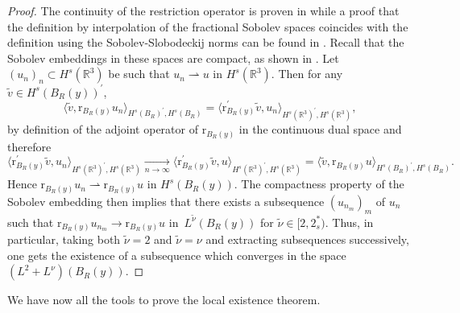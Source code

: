 \documentclass[12pt,a4paper]{amsart}
\numberwithin{equation}{section}
\newcommand{\twoasts}{{2^*_s}}
\begin{document}
	\begin{proof}
		The continuity of the restriction operator is proven in \cite[Theorem 9.1]{lions2012non} while a proof that the definition by interpolation of the fractional Sobolev spaces coincides with the definition using the Sobolev-Slobodeckij norms can be found in \cite[Remark 2, Section 4.4.1]{triebel1978interpolation}. Recall that the Sobolev embeddings in these spaces are compact, as shown in \cite[Theorem 7.1, Corollary 7.2]{dinezza2012521}.
		Let~$(u_n)_n \subset H^s(\mathbb{R}^3) $ be such that $ u_n \rightharpoonup u $ in $ H^{s}(\mathbb{R}^3) $. Then for any $ \tilde{v} \in H^{s}(B_R(y))^\prime $, 
		\begin{equation}
			\langle \tilde{v}, \mathrm{r}_{B_R(y)} u_n \rangle_{H^{s}(B_R)^\prime,H^{s}(B_R)} = \langle \mathrm{r}_{B_R(y)}^\prime \tilde{v}, u_n \rangle_{H^{s}(\mathbb{R}^3)^\prime,H^{s}(\mathbb{R}^3)} ,
		\end{equation}
		by definition of the adjoint operator of $ \mathrm{r}_{B_R(y)} $ in the continuous dual space and therefore
		\begin{equation}
			\langle \mathrm{r}_{B_R(y)}^\prime \tilde{v}, u_n \rangle_{H^{s}(\mathbb{R}^3)^\prime,H^{s}(\mathbb{R}^3)} 
			\xrightarrow[n\to\infty]{}  \langle \mathrm{r}_{B_R(y)}^\prime \tilde{v}, u \rangle_{H^{s}(\mathbb{R}^3)^\prime,H^{s}(\mathbb{R}^3)} 
			=  \langle \tilde{v}, \mathrm{r}_{B_R(y)} u \rangle_{H^{s}(B_R)^\prime,H^{s}(B_R)} .
		\end{equation}
		Hence  $ \mathrm{r}_{B_R(y)} u_n \rightharpoonup \mathrm{r}_{B_R(y)} u $ in $ H^{s}(B_R(y)) $. The compactness property of the Sobolev embedding then implies that there exists a subsequence $(u_{n_m})_m$ of $u_n$ such that $ \mathrm{r}_{B_R(y)} u_{n_m} \to \mathrm{r}_{B_R(y)} u  $ in~$L^{\tilde{\nu}}(B_R(y))$ for $\tilde{\nu}\in[2,\twoasts)$. Thus, in particular, taking both $\tilde{\nu}=2$ and $\tilde{\nu}=\nu$ and extracting subsequences successively, one gets the existence of a subsequence which converges in the space~$(L^2+L^{{\nu}})(B_R(y))$.
	\end{proof}
	
	We have now all the tools to prove the local existence theorem. 
	
\end{document}

